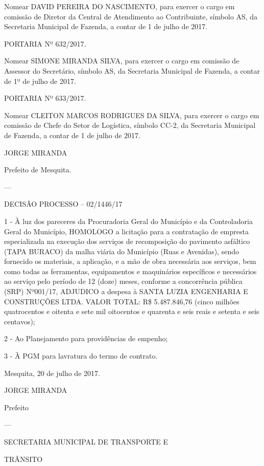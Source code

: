\documentclass{doliberto}
\begin{document}
Nomear  DAVID  PEREIRA  DO  NASCIMENTO,  para  exercer 
o  cargo  em  comissão  de  Diretor  da  Central  de 
Atendimento ao Contribuinte, símbolo AS, da Secretaria 
Municipal de Fazenda, a contar de 1 de julho de 2017. 
 
PORTARIA Nº 632/2017. 
 
Nomear  SIMONE  MIRANDA  SILVA,  para  exercer  o  cargo 
em  comissão  de  Assessor  do  Secretário,  símbolo  AS,  da 
Secretaria Municipal de Fazenda, a contar de 1º de julho 
de 2017. 
 
PORTARIA Nº 633/2017. 
 
Nomear  CLEITON  MARCOS  RODRIGUES  DA  SILVA,  para 
exercer  o  cargo  em  comissão  de  Chefe  do  Setor  de 
Logística,  símbolo  CC-2,  da  Secretaria  Municipal  de 
Fazenda, a contar de 1 de julho de 2017. 

 

JORGE MIRANDA 

Prefeito de Mesquita. 

---

DECISÃO PROCESSO – 02/1446/17 

 
1 - À luz dos pareceres da Procuradoria Geral do Município 
e  da  Controladoria  Geral  do  Município,  HOMOLOGO  a 
licitação  para  a  contratação  de  empresta  especializada  na 
execução  dos  serviços  de  recomposição  do  pavimento 
asfáltico  (TAPA  BURACO)  da  malha  viária  do  Município 
(Ruas  e  Avenidas),  sendo  fornecido  os  materiais,  a 
aplicação,  e  a  mão  de  obra  necessária  aos  serviços,  bem 
como  todas  as  ferramentas,  equipamentos  e  maquinários 
específicos  e  necessários  ao  serviço  pelo  período  de  12 
(doze)  meses,  conforme  a  concorrência  pública  (SRP) 
Nº001/17,  ADJUDICO  a  despesa  à  SANTA  LUZIA 
ENGENHARIA  E  CONSTRUÇÕES  LTDA.  VALOR  TOTAL:  R\$ 
5.487.846,76  (cinco  milhões  quatrocentos  e  oitenta  e  sete 
mil  oitocentos  e  quarenta  e  seis  reais  e  setenta  e  seis 
centavos); 
 
2 - Ao Planejamento para providências de empenho; 
 
3 - À PGM para lavratura do termo de contrato. 
 

Mesquita, 20 de julho de 2017. 
 

JORGE MIRANDA 

Prefeito 

---

SECRETARIA MUNICIPAL DE TRANSPORTE E 

TRÂNSITO 
\end{document}
